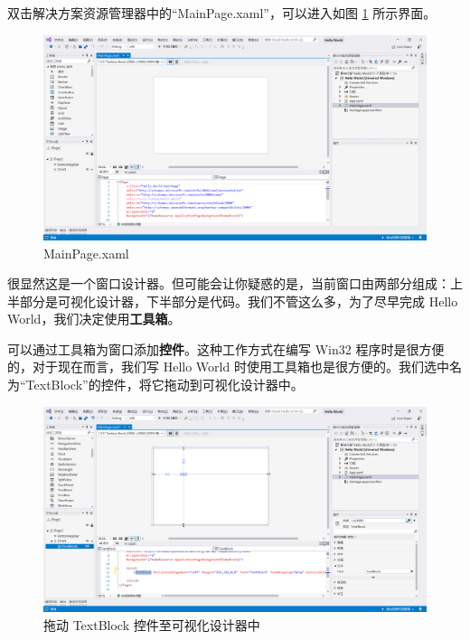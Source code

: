 双击解决方案资源管理器中的``MainPage.xaml''，可以进入如图 \ref{pic9} 所示界面。
\begin{figure}[htbp]
    \centering
    \includegraphics[width = 0.5\paperwidth]{pic/9.png}
    \caption{MainPage.xaml}
    \label{pic9}
\end{figure}

很显然这是一个窗口设计器。但可能会让你疑惑的是，当前窗口由两部分组成：上半部分是可视化设计器，下半部分是代码。我们不管这么多，为了尽早完成 Hello World，我们决定使用\textbf{工具箱}。

可以通过工具箱为窗口添加\textbf{控件}。这种工作方式在编写 Win32 程序时是很方便的，对于现在而言，我们写 Hello World 时使用工具箱也是很方便的。我们选中名为``TextBlock''的控件，将它拖动到可视化设计器中。
\begin{figure}[htbp]
    \centering
    \includegraphics[width = 0.5\paperwidth]{pic/10.png}
    \caption{拖动 TextBlock 控件至可视化设计器中}
\end{figure}

